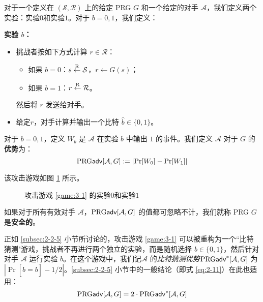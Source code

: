 \begin{game}[伪随机生成器]\label{game:3-1}
对于一个定义在 $(\mathcal{S},\mathcal{R})$ 上的给定 PRG $G$ 和一个给定的对手 $\mathcal{A}$，我们定义两个实验：实验$0$和实验$1$。对于 $b=0,1$，我们定义：

\noindent\textbf{实验 $b$：}
\begin{itemize}
	\item 挑战者按如下方式计算 $r\in\mathcal{R}$：
	\begin{itemize}
		\item 如果 $b=0$：$s\overset{\rm R}\leftarrow\mathcal{S}$，$r\leftarrow G(s)$；
		\item 如果 $b=1$：$r\overset{\rm R}\leftarrow\mathcal{R}$。
	\end{itemize}
	然后将 $r$ 发送给对手。
	\item 给定$r$，对手计算并输出一个比特 $\hat{b}\in\{0,1\}$。
\end{itemize}

对于 $b=0,1$，定义 $W_b$ 是 $\mathcal{A}$ 在实验 $b$ 中输出 $1$ 的事件。我们定义 $\mathcal{A}$ 对于 $G$ 的\textbf{优势}为：
\[
{\rm PRG\mathsf{adv}}[\mathcal{A},G]:=|{\rm Pr}[W_0]-{\rm Pr}[W_1]|
\]
\end{game}

该攻击游戏如图 \ref{fig:3-1} 所示。

\begin{figure}
	\centering
	
	\caption{攻击游戏 \ref{game:3-1} 的实验$0$和实验$1$}
	\label{fig:3-1}
\end{figure}

\begin{definition}\label{def:3-1}
如果对于所有有效对手 $\mathcal{A}$，${\rm PRG\mathsf{adv}}[\mathcal{A},G]$ 的值都可忽略不计，我们就称 PRG $G$ 是\textbf{安全的}。

\end{definition}

正如 \ref{subsec:2-2-5} 小节所讨论的，攻击游戏 \ref{game:3-1} 可以被重构为一个``比特猜测"游戏，挑战者不再进行两个独立的实验，而是随机选择 $b\in\{0,1\}$，然后针对对手 $\mathcal{A}$ 运行实验 $b$。在这个游戏中，我们记$\mathcal{A}$ 的\emph{比特猜测优势}${\rm PRG\mathsf{adv}}^*[\mathcal{A},G]$ 为 $|\Pr[\hat b=b]-{1}/{2}|$。\ref{subsec:2-2-5} 小节中的一般结论（即式 \ref{eq:2-11}）在此也适用：
\begin{equation}
{\rm PRG\mathsf{adv}}[\mathcal{A},G]=2\cdot{\rm PRG\mathsf{adv}}^*[\mathcal{A},G]
\end{equation}

